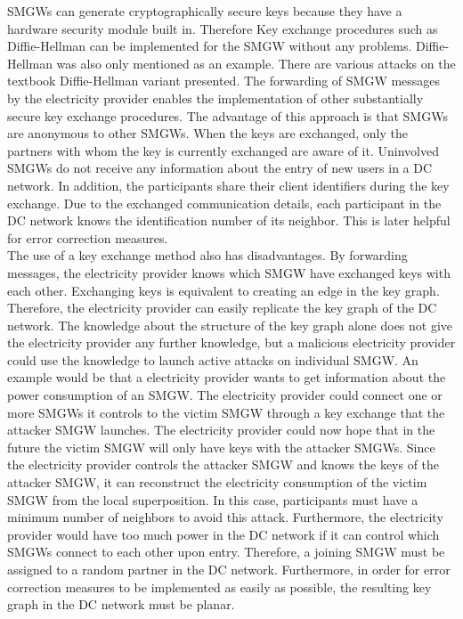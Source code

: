SMGWs can generate cryptographically secure keys because they have a hardware security module built in. Therefore Key exchange procedures such as Diffie-Hellman can be implemented for the SMGW without any problems. Diffie-Hellman was also only mentioned as an example. There are various attacks on the textbook Diffie-Hellman variant presented.%
The forwarding of SMGW messages by the electricity provider enables the implementation of other substantially secure key exchange procedures. The advantage of this approach is that SMGWs are anonymous to other SMGWs. When the keys are exchanged, only the partners with whom the key is currently exchanged are aware of it. Uninvolved SMGWs do not receive any information about the entry of new users in a DC network. In addition, the participants share their client identifiers during the key exchange. Due to the exchanged communication details, each participant in the DC network knows the identification number of its neighbor. This is later helpful for error correction measures. %
\\The use of a key exchange method also has disadvantages. By forwarding messages, the electricity provider knows which SMGW have exchanged keys with each other. Exchanging keys is equivalent to creating an edge in the key graph.%
Therefore, the electricity provider can easily replicate the key graph of the DC network. The knowledge about the structure of the key graph alone does not give the electricity provider any further knowledge, but a malicious electricity provider could use the knowledge to launch active attacks on individual SMGW. An example would be that a electricity provider wants to get information about the power consumption of an SMGW. The electricity provider could connect one or more SMGWs it controls to the victim SMGW through a key exchange that the attacker SMGW launches. The electricity provider could now hope that in the future the victim SMGW will only have keys with the attacker SMGWs. Since the electricity provider controls the attacker SMGW and knows the keys of the attacker SMGW, it can reconstruct the electricity consumption of the victim SMGW from the local superposition. In this case, participants must have a minimum number of neighbors to avoid this attack. Furthermore, the electricity provider would have too much power in the DC network if it can control which SMGWs connect to each other upon entry. Therefore, a joining SMGW must be assigned to a random partner in the DC network. Furthermore, in order for error correction measures to be implemented as easily as possible, the resulting key graph in the DC network must be planar.\\
